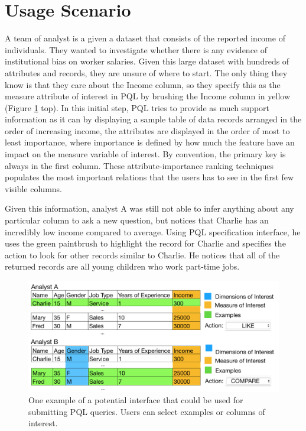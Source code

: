 \documentclass{sig-alternate-05-2015}
\begin{document}
\section{Usage Scenario}
\par A team of analyst is a given a dataset that consists of the reported income of individuals. They wanted to investigate whether there is any evidence of institutional bias on worker salaries. Given this large dataset with hundreds of attributes and records, they are unsure of where to start. The only thing they know is that they care about the Income column, so they specify this as the measure attribute of interest in PQL by brushing the Income column in yellow (Figure \ref{example} top). In this initial step, PQL tries to provide as much support information as it can by displaying a sample table of data records arranged in the order of increasing income, the attributes are displayed in the order of most to least importance, where importance is defined by how much the feature have an impact on the measure variable of interest. By convention, the primary key is always in the first column. These attribute-importance ranking techniques populates the most important relations that the users has to see in the first few visible columns.
\par Given this information, analyst A was still not able to infer anything about any particular column to ask a new question, but notices that Charlie has an incredibly low income compared to average. Using PQL specification interface, he uses the green paintbrush to highlight the record for Charlie and specifies the action to look for other records similar to Charlie. He notices that all of the returned records are all young children who work part-time jobs.
\begin{figure}[ht!]\label{example}
\includegraphics[width=\linewidth]{figures/example2.png}
\caption{One example of a potential interface that could be used for submitting PQL queries. Users can select examples or columns of interest. }
\end{figure}
\end{document}
